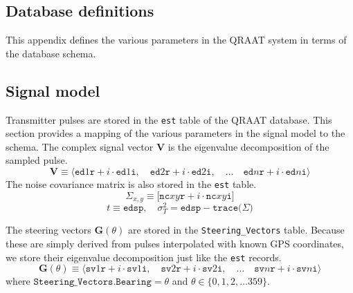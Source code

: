 \documentclass[letter]{article}
\begin{document}
\begin{appendices}

\section{Database definitions}
This appendix defines the various parameters in the QRAAT system in terms of the 
database schema. 

\subsection{Signal model} 
Transmitter pulses are stored in the \texttt{est} table of the QRAAT database. This section 
provides a mapping of the various parameters in the signal model to the schema. The complex 
signal vector $\mathbf{V}$ is the eigenvalue decomposition of the sampled pulse.
$$ \mathbf{V} \equiv 
  \langle 
    \texttt{ed}1\texttt{r} + i \cdot \texttt{ed}1\texttt{i}, \quad
    \texttt{ed}2\texttt{r} + i \cdot \texttt{ed}2\texttt{i}, \quad \dots \quad
    \texttt{ed}n\texttt{r} + i \cdot \texttt{ed}n\texttt{i}  
  \rangle $$
The noise covariance matrix is also stored in the \texttt{est} table. 
$$ \Sigma_{x,y} \equiv \Big[ \texttt{nc}xy\texttt{r} + 
                            i \cdot \texttt{nc}xy\texttt{i} \Big] $$
$$ t \equiv \texttt{edsp}, \quad \sigma_T^2 = \texttt{edsp} - 
                                 \texttt{trace(}\Sigma\texttt{)} $$ 

The steering vectors $\mathbf{G}(\theta)$ are stored in the \texttt{Steering\_Vectors} table.
Because these are simply derived from pulses interpolated with known GPS coordinates, we 
store their eigenvalue decomposition just like the \texttt{est} records. 
$$ \mathbf{G}(\theta) \equiv 
  \langle 
    \texttt{sv}1\texttt{r} + i \cdot \texttt{sv}1\texttt{i}, \quad
    \texttt{sv}2\texttt{r} + i \cdot \texttt{sv}2\texttt{i}, \quad \dots \quad
    \texttt{sv}n\texttt{r} + i \cdot \texttt{sv}n\texttt{i}  
  \rangle $$
where $\texttt{Steering\_Vectors.Bearing} = \theta$ and $\theta \in \{ 0, 1, 2, \dots 359 \}$.  
\end{appendices}
\end{document}
